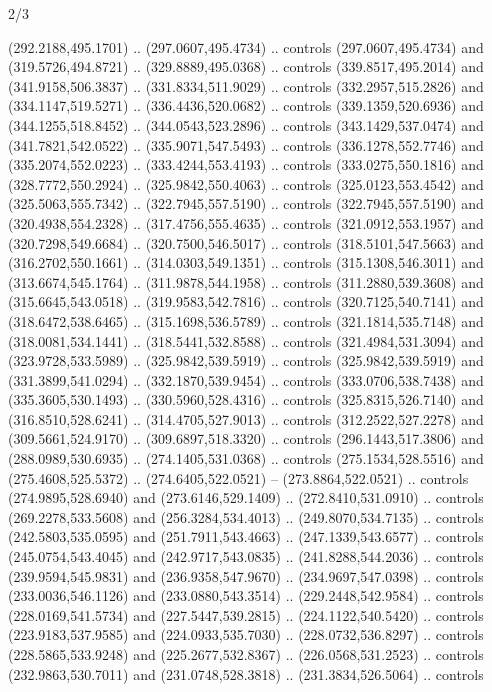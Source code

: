 \begin{flagdescription}{2/3}
\begin{scope}[shift={(0.5\flaglength,0.5)},scale=\flagwidth/480]
\begin{scope}[y=0.8pt, x=0.8pt, yscale=-1,shift={(-450,-300)}]
\begin{scope}[cm={{0.4207,0.0,0.0,0.42106,(305.246,151.6454)}}]
\begin{scope}[cm={{2.15708,0.0,0.0,2.15708,(-419.5071,-975.3591)}}]
\begin{scope}[shift={(4.0,80.0)},shift={(0,0)}]
  (292.2188,495.1701) .. (297.0607,495.4734) .. controls (297.0607,495.4734) and
  (319.5726,494.8721) .. (329.8889,495.0368) .. controls (339.8517,495.2014) and
  (341.9158,506.3837) .. (331.8334,511.9029) .. controls (332.2957,515.2826) and
  (334.1147,519.5271) .. (336.4436,520.0682) .. controls (339.1359,520.6936) and
  (344.1255,518.8452) .. (344.0543,523.2896) .. controls (343.1429,537.0474) and
  (341.7821,542.0522) .. (335.9071,547.5493) .. controls (336.1278,552.7746) and
  (335.2074,552.0223) .. (333.4244,553.4193) .. controls (333.0275,550.1816) and
  (328.7772,550.2924) .. (325.9842,550.4063) .. controls (325.0123,553.4542) and
  (325.5063,555.7342) .. (322.7945,557.5190) .. controls (322.7945,557.5190) and
  (320.4938,554.2328) .. (317.4756,555.4635) .. controls (321.0912,553.1957) and
  (320.7298,549.6684) .. (320.7500,546.5017) .. controls (318.5101,547.5663) and
  (316.2702,550.1661) .. (314.0303,549.1351) .. controls (315.1308,546.3011) and
  (313.6674,545.1764) .. (311.9878,544.1958) .. controls (311.2880,539.3608) and
  (315.6645,543.0518) .. (319.9583,542.7816) .. controls (320.7125,540.7141) and
  (318.6472,538.6465) .. (315.1698,536.5789) .. controls (321.1814,535.7148) and
  (318.0081,534.1441) .. (318.5441,532.8588) .. controls (321.4984,531.3094) and
  (323.9728,533.5989) .. (325.9842,539.5919) .. controls (325.9842,539.5919) and
  (331.3899,541.0294) .. (332.1870,539.9454) .. controls (333.0706,538.7438) and
  (335.3605,530.1493) .. (330.5960,528.4316) .. controls (325.8315,526.7140) and
  (316.8510,528.6241) .. (314.4705,527.9013) .. controls (312.2522,527.2278) and
  (309.5661,524.9170) .. (309.6897,518.3320) .. controls (296.1443,517.3806) and
  (288.0989,530.6935) .. (274.1405,531.0368) .. controls (275.1534,528.5516) and
  (275.4608,525.5372) .. (274.6405,522.0521) -- (273.8864,522.0521) .. controls
  (274.9895,528.6940) and (273.6146,529.1409) .. (272.8410,531.0910) .. controls
  (269.2278,533.5608) and (256.3284,534.4013) .. (249.8070,534.7135) .. controls
  (242.5803,535.0595) and (251.7911,543.4663) .. (247.1339,543.6577) .. controls
  (245.0754,543.4045) and (242.9717,543.0835) .. (241.8288,544.2036) .. controls
  (239.9594,545.9831) and (236.9358,547.9670) .. (234.9697,547.0398) .. controls
  (233.0036,546.1126) and (233.0880,543.3514) .. (229.2448,542.9584) .. controls
  (228.0169,541.5734) and (227.5447,539.2815) .. (224.1122,540.5420) .. controls
  (223.9183,537.9585) and (224.0933,535.7030) .. (228.0732,536.8297) .. controls
  (228.5865,533.9248) and (225.2677,532.8367) .. (226.0568,531.2523) .. controls
  (232.9863,530.7011) and (231.0748,528.3818) .. (231.3834,526.5064) .. controls

\end{scope}
\end{scope}
\end{scope}
\end{scope}
\end{scope}
\end{flagdescription}
